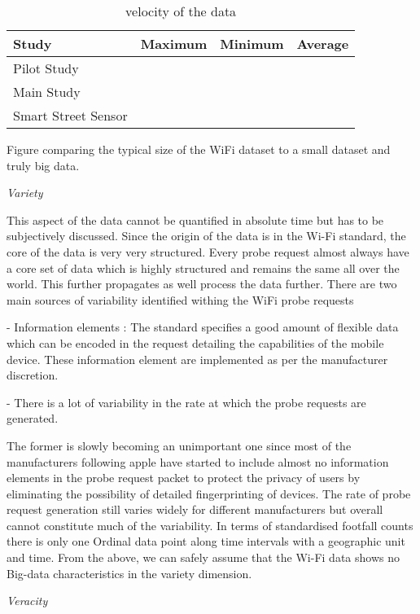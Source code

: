 \begin{table}
    \centering
    \begin{tabular}{|l|c|c|c|}
        \hline
        Study & Maximum & Minimum & Average \\
        \hline
        Pilot Study & & & \\
        Main Study & & & \\
        Smart Street Sensor & & & \\
        \hline
    \end{tabular}
    \caption{velocity of the data}
    \label{velocity_table}
\end{table}

Figure comparing the typical size of the WiFi dataset to a small dataset and truly big data.

\textit{Variety}

This aspect of the data cannot be quantified in absolute time but has to be subjectively discussed.
Since the origin of the data is in the Wi-Fi standard, the core of the data is very very structured.
Every probe request almost always have a core set of data which is highly structured and remains the same all over the world.
This further propagates as well process the data further.
There are two main sources of variability identified withing the WiFi probe requests

 - Information elements : The standard specifies a good amount of flexible data  which can be encoded in the request detailing the capabilities of the mobile  device.
These information element are implemented as per the manufacturer  discretion.

 - There is a lot of variability in the rate at which the probe requests are  generated.

The former is slowly becoming an unimportant one since most of the manufacturers following apple have started to include almost no information elements in the probe request packet to protect the privacy of users by eliminating the possibility of detailed fingerprinting of devices.
The rate of probe request generation still varies widely for different manufacturers but overall cannot constitute much of the variability.
In terms of standardised footfall counts there is only one Ordinal data point along time intervals with a geographic unit and time.
From the above, we can safely assume that the Wi-Fi data shows no Big-data characteristics in the variety dimension.

\textit{Veracity}

